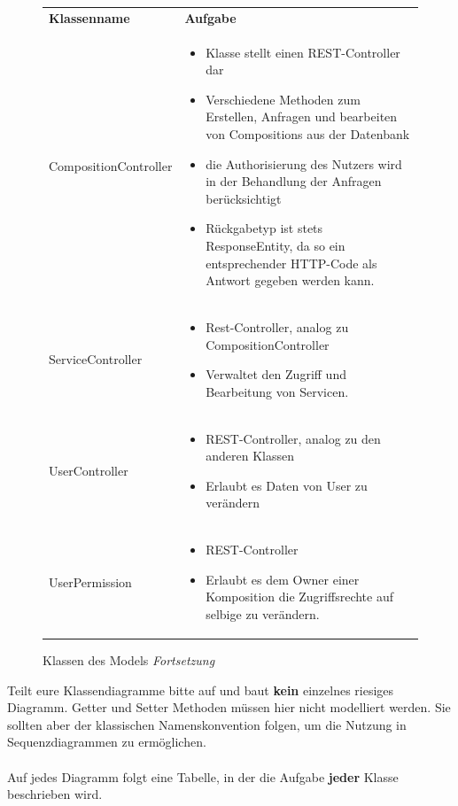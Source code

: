 \begin{figure}[h]
	\begin{tabularx}{\textwidth}{p{} | X}
		\rowcolor[HTML]{C0C0C0}
		\textbf{Klassenname} & \textbf{Aufgabe} \\
		CompositionController & \begin{itemize}
		\item Klasse stellt einen REST-Controller dar
		\item Verschiedene Methoden zum Erstellen, Anfragen und bearbeiten von Compositions aus der Datenbank
		\item die Authorisierung des Nutzers wird in der Behandlung der Anfragen berücksichtigt
		\item Rückgabetyp ist stets ResponseEntity, da so ein entsprechender HTTP-Code als Antwort gegeben werden kann.
		\end{itemize}\\
		\rowcolor[HTML]{E7E7E7}
		ServiceController & \begin{itemize}
			\item Rest-Controller, analog zu CompositionController
			\item Verwaltet den Zugriff und Bearbeitung von Servicen.
		\end{itemize}\\
		UserController & \begin{itemize}
			\item REST-Controller, analog zu den anderen Klassen
			\item Erlaubt es Daten von User zu verändern
		\end{itemize}\\
		\rowcolor[HTML]{E7E7E7}
		UserPermission & \begin{itemize}
			\item REST-Controller
			\item Erlaubt es dem Owner einer Komposition die Zugriffsrechte auf selbige zu verändern.
		\end{itemize}
	\end{tabularx}
	\caption{Klassen des Models \textit{Fortsetzung}}
\end{figure}

\begin{tcolorbox}
Teilt eure Klassendiagramme bitte auf und baut \textbf{kein} einzelnes riesiges Diagramm.
Getter und Setter Methoden müssen hier nicht modelliert werden.
Sie sollten aber der klassischen Namenskonvention folgen, um die Nutzung in Sequenzdiagrammen zu ermöglichen.
\\\\
Auf jedes Diagramm folgt eine Tabelle, in der die Aufgabe \textbf{jeder} Klasse beschrieben wird.
\end{tcolorbox}

